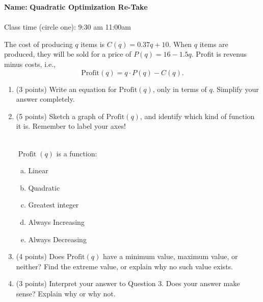 \documentclass{article}
\begin{document}
\noindent \textbf{Name:}\underline{\hspace{2in}} \hfill \textbf{Quadratic Optimization Re-Take}
\\ \\
Class time (circle one): 9:30 am \hspace{1cm} 11:00am
\vspace{1em}

The cost of producing $q$ items is $C(q) = 0.37 q + 10$. When $q$ items are produced, they will be sold for a price of $P(q) = 16 - 1.5 q$. Profit is revenus minus costs, i.e.,
  \[
    \text{Profit}(q) = q \cdot P(q) - C(q).
  \]

  \begin{enumerate}
  \item (3 points) Write an equation for $\text{Profit}(q)$, only in terms of $q$. Simplify your answer completely.
    \vspace{2.5in}
  \item (5 points) Sketch a graph of $\text{Profit}(q)$, and identify which kind of function it is. Remember to label your axes!
    \begin{multicols}{2}
      \columnbreak
      ~\\
        $\operatorname{Profit}(q)$ is a \underline{\hspace{8em}} function:
        \begin{enumerate}[(a)]
          \setlength\itemsep{2.5em}
          \item Linear
          \item Quadratic
          \item Greatest integer
          \item Always Increasing
          \item Always Decreasing
        \end{enumerate}
    \end{multicols}
\pagebreak
\item (4 points) Does $\text{Profit}(q)$ have a minimum value, maximum value, or neither? Find the extreme value, or explain why no such value exists.
  \vspace{3in}
\item (3 points) Interpret your answer to Question 3. Does your answer make sense? Explain why or why not.
  
\end{enumerate}
\end{document}
